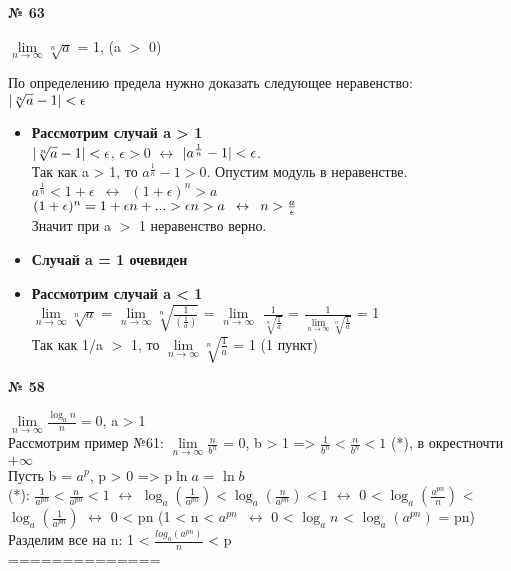 \documentclass[12pt]{article}
\DeclarePairedDelimiter\abs{\lvert}{\rvert}%
\begin{document}
	\vspace{1cm}
	{
		{\textbf{№ 63}\\ \par}
		{\large $\lim\limits_{n \to \infty} \sqrt[n]{a}$ = 1, (a $>$ 0)\\\par}
		По определению предела нужно доказать следующее неравенство:\\ \enspace\enspace$\abs{\sqrt[n]{a}-1}<\epsilon$
		\begin{itemize}
			\item { 
				\textbf{Рассмотрим случай a > 1}\\
				$\abs{\sqrt[n]{a}-1}<\epsilon$, \enspace\enspace $\epsilon>0$ $\leftrightarrow$ 
				$\abs{a^{\frac{1}{n}} - 1}<\epsilon$.\\ Так как a > 1, то $a^{\frac{1}{n}}-1>0$. Опустим модуль в неравенстве.\\
				$a^{\frac{1}{n}}<1+\epsilon \enspace \leftrightarrow \enspace (1+\epsilon)^n>a$\\
				$(1+\epsilon)^n=1+\epsilon n + ...>\epsilon n>a \enspace \leftrightarrow \enspace n>{\large \frac{a}{\epsilon}}$\\
				Значит при a $>$ 1 неравенство верно.
			}
			\item{
				\textbf{Случай a = 1 очевиден}
			}
			\item{
				\textbf{Рассмотрим случай a < 1}\\
				{\large $\lim\limits_{n \to \infty} \sqrt[n]{a}$ = $\lim\limits_{n \to \infty} \sqrt[n]{\frac{1}{(\frac{1}{a})}}$ = 
					$\lim\limits_{n \to \infty}$ $\frac{1}{\sqrt[n]{\frac{1}{a}}}$ = $\frac{1}{\lim\limits_{n \to \infty} \sqrt[n]{\frac{1}{a}}}$} = 1\\
				Так как 1/a $>$ 1, то $\lim\limits_{n \to \infty} \sqrt[n]{\frac{1}{a}}$ = 1 \enspace\enspace(1 пункт)
			}
		\end{itemize}
	}

	\vspace{1cm}
	{
		{\textbf{№ 58}\\ \par}
		{\large $\lim\limits_{n \to \infty}\frac{\log_a n}{n}=0$, a > 1\\}
		Рассмотрим пример №61: $\lim\limits_{n \to \infty} \frac{n}{b^n}$ = 0, b > 1 => 
		$\frac{1}{b^n} < \frac{n}{b^n}<1$ (*), в окрестночти $+\infty$\\
		Пусть b = $a^p$, p > 0 => p$\ln a$ = $\ln b$\\
		(*): $\frac{1}{a^{pn}}<\frac{n}{a^{pn}}<1$ $\leftrightarrow$ $\log_a( \frac{1}{a^{pn}})<\log_a(\frac{n}{a^{pn}})<1$ $\leftrightarrow$ 0 < $\log_a(\frac{a^{pn}}{n})$ < $\log_a(\frac{1}{a^{pn}})$ $\leftrightarrow$ 0 <
		 pn (1 < n < $a ^ {pn} \enspace \leftrightarrow$ 
		0 < $\log_an$ < $\log_a(a^{pn})$ = pn)\\ 
		Разделим все на n: 1 < $\frac{log_a(a^{pn})}{n}$ < p\\
		==============
	}
\end{document}
